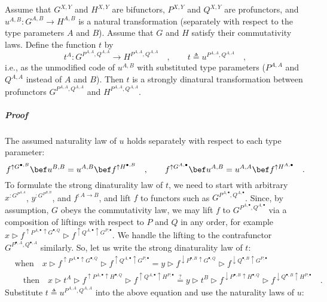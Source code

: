 Assume that $G^{X,Y}$ and $H^{X,Y}$ are bifunctors, $P^{X,Y}$ and
$Q^{X,Y}$ are profunctors, and $u^{A,B}:G^{A,B}\rightarrow H^{A,B}$
is a natural transformation (separately with respect to the type parameters
$A$ and $B$). Assume that $G$ and $H$ satisfy their commutativity
laws. Define the function $t$ by
\[
t^{A}:G^{P^{A,A},Q^{A,A}}\rightarrow H^{P^{A,A},Q^{A,A}}\quad,\quad\quad t\triangleq u^{P^{A,A},Q^{A,A}}\quad,
\]
i.e., as the unmodified code of $u^{A,B}$ with substituted type parameters
($P^{A,A}$ and $Q^{A,A}$ instead of $A$ and $B$). Then $t$ is
a strongly dinatural transformation between profunctors $G^{P^{A,A},Q^{A,A}}$
and $H^{P^{A,A},Q^{A,A}}$.

\subparagraph{Proof}

The assumed naturality law of $u$ holds separately with respect to
each type parameter:
\[
f^{\uparrow G^{\bullet,B}}\bef u^{B,B}=u^{A,B}\bef f^{\uparrow H^{\bullet,B}}\quad,\quad\quad f^{\uparrow G^{A,\bullet}}\bef u^{A,B}=u^{A,A}\bef f^{\uparrow H^{A,\bullet}}\quad.
\]
To formulate the strong dinaturality law of $t$, we need to start
with arbitrary $x^{:G^{P^{A,A}}}$, $y^{:G^{P^{B,B}}}$, and $f^{:A\rightarrow B}$,
and lift $f$ to functors such as $G^{P^{A,\bullet},Q^{A,\bullet}}$.
Since, by assumption, $G$ obeys the commutativity law, we may lift
$f$ to $G^{P^{A,\bullet},Q^{A,\bullet}}$ via a composition of liftings
with respect to $P$ and $Q$ in any order, for example $x\triangleright f^{\uparrow P^{A,\bullet}\uparrow G^{\bullet,Q}}\triangleright f^{\uparrow Q^{A,\bullet}\uparrow G^{P,\bullet}}$.
We handle the lifting to the contrafunctor $G^{P^{\bullet,A},Q^{\bullet,A}}$
similarly. So, let us write the strong dinaturality law of $t$: 
\begin{align*}
 & \text{when}\quad x\triangleright f^{\uparrow P^{A,\bullet}\uparrow G^{\bullet,Q}}\triangleright f^{\uparrow Q^{A,\bullet}\uparrow G^{P,\bullet}}=y\triangleright f^{\downarrow P^{\bullet,B}\uparrow G^{\bullet,Q}}\triangleright f^{\downarrow Q^{\bullet,B}\uparrow G^{P,\bullet}}\\
 & \quad\text{then}\quad x\triangleright t^{A}\triangleright f^{\uparrow P^{A,\bullet}\uparrow H^{\bullet,Q}}\triangleright f^{\uparrow Q^{A,\bullet}\uparrow H^{P,\bullet}}\overset{?}{=}y\triangleright t^{B}\triangleright f^{\downarrow P^{\bullet,B}\uparrow H^{\bullet,Q}}\triangleright f^{\downarrow Q^{\bullet,B}\uparrow H^{P,\bullet}}\quad.
\end{align*}
Substitute $t\triangleq u^{P^{A,A},Q^{A,A}}$ into the above equation
and use the naturality laws of $u$:
